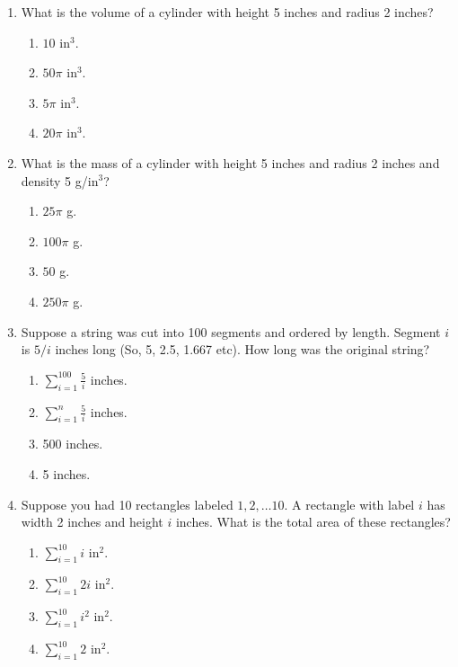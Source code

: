\documentclass{article}
\begin{document}
\begin{enumerate}
\begin{enumerate}
  \end{enumerate}
  
  \item What is the volume of a cylinder with height 5 inches and radius 2 inches?
  \begin{enumerate}
    \item $10$ in$^3$.
    \item $50\pi$ in$^3$.
    \item $5\pi$ in$^3$.
    \item $20\pi$ in$^3$. %
  \end{enumerate}
  
  \item What is the mass of a cylinder with height 5 inches and radius 2 inches and density 5 g/in$^3$?
  \begin{enumerate}
    \item $25\pi$ g.
    \item $100\pi$ g. %
    \item $50$ g.
    \item $250\pi$ g.
  \end{enumerate}
  
  
  \newpage
  
  \item Suppose a string was cut into 100 segments and ordered by length.  Segment $i$ is $5/i$ inches long (So, 5, 2.5, 1.667 etc).  How long was the original string?
  \begin{enumerate}
    \item $\displaystyle \sum_{i=1}^{100} \frac{5}{i}$ inches.  %
    \item $\displaystyle \sum_{i=1}^n \frac{5}{i}$ inches. 
    \item 500 inches. 
    \item 5 inches.
  \end{enumerate}
  
  \item Suppose you had 10 rectangles labeled $1, 2, \ldots 10$.  A rectangle with label $i$ has width 2 inches and height $i$ inches.  What is the total area of these rectangles?
  \begin{enumerate}
    \item $\displaystyle \sum_{i=1}^{10} i$ in$^2$.  
    \item $\displaystyle \sum_{i=1}^{10} 2i$ in$^2$. %
    \item $\displaystyle \sum_{i=1}^{10} i^2$ in$^2$.
    \item $\displaystyle \sum_{i=1}^{10} 2$ in$^2$.
  \end{enumerate}



\end{enumerate}
\end{document}
